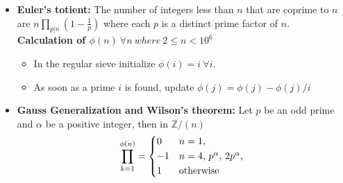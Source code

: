 \documentclass[12pt,a4paper,landscape]{amsart}
\begin{document}
\begin{multicols*}{3}
\begin{itemize}
\begin{itemize}[leftmargin=*]
		\end{itemize}
	\item \textbf{Euler's totient:} The number of integers less than
	$n$ that are coprime to $n$ are $n\prod_{p|n}\left(1 - \frac{1}{p}\right)$
	where each $p$ is a distinct prime factor of $n$.\\
	\textbf{Calculation of $\phi(n)\ \forall n\ where\ 2 \leq n < 10^6$}
		\begin{itemize}
			\item In the regular sieve initialize $\phi(i) = i\ \forall i$.
			\item As soon as a prime $i$ is found, update $\phi(j) = \phi(j) - \phi(j)/i$
		\end{itemize}
	\item \textbf{Gauss Generalization and Wilson's theorem: } Let $p$ be an odd prime and $\alpha$ be a positive integer, then in $\mathbb{Z}/(n)$
		\begin{equation*}
			\prod_{k = 1}^{\phi(n)} = 
				\begin{cases*}
					0 & $n = 1$,\\
					-1 & $n = 4$, $p^{\alpha}$, $2p^{\alpha}$, \\
					1 & otherwise
				\end{cases*}
		\end{equation*}
	

\end{itemize}
\end{multicols*}
\end{document}
